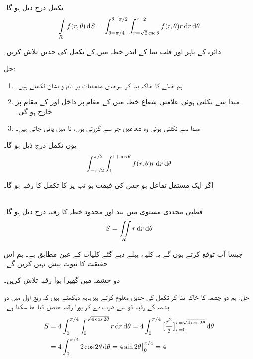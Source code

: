  تکمل درج ذیل ہو گا۔
\begin{align*}
\int\limits_R f(r,\theta)\dif S=\int_{\theta=\pi/4}^{\theta=\pi/2}\int_{r=\sqrt{2}\csc\theta}^{r=2}f(r,\theta)r\dif r\dif \theta
\end{align*}

دائرہ  کے باہر اور قلب نما  کے اندر خطہ میں   کے تکمل کی  حدیں  تلاش کریں۔ 

حل:\quad
\begin{enumerate}[1.]
\item
{}\quad
ہم خطے کا خاکہ بنا کر  سرحدی منحنیات پر نام و نشان لکھتے ہیں۔
\item
{}\quad
مبدا سے  نکلتی ہوئی  علامتی شعاع خطہ  میں  کے مقام پر داخل اور  کے مقام پر خارج ہو گی۔
\item
{}\quad
مبدا سے نکلتی ہوئی وہ شعاعیں جو  سے گزرتی ہوں،  تا  میں پائی جاتی ہیں۔
\end{enumerate}
یوں تکمل درج ذیل ہو گا۔
\begin{align*}
\int_{-\pi/2}^{\pi/2}\int_{1}^{1+\cos\theta}f(r,\theta)r\dif r\dif \theta
\end{align*}

اگر  ایک مستقل تفاعل ہو جس کی قیمت  ہو  تب  پر  کا تکمل  کا رقبہ ہو گا۔

\\
قطبی محددی مستوی میں بند اور محدود خطہ  کا  رقبہ درج ذیل ہو گا۔
\begin{align}
S=\iint\limits_R r\dif r\dif\theta
\end{align}

جیسا آپ توقع کرتے ہوں گے یہ کلیہ، پہلے دیے گئے کلیات کے عین مطابق ہے۔ ہم اس حقیقت کا ثبوت پیش نہیں کریں گے۔

دو  چشمہ  میں گھیرا ہوا  رقبہ تلاش کریں۔

حل:\quad
ہم دو چشمہ کا خاکہ بنا کر تکمل کی حدیں معلوم کرتے ہیں۔ہم دیکھتے ہیں کہ ربع اول میں دو چشمہ کے رقبہ کو  سے ضرب دے کر پورا رقبہ حاصل کیا جا سکتا ہے۔
\begin{align*}
S&=4\int_{0}^{\pi/4}\int_0^{\sqrt{4\cos2\theta}}r\dif r\dif \theta=4\int_0^{\pi/4}\big[\frac{r^2}{2}\big]_{r=0}^{r=\sqrt{4\cos2\theta}}\dif\theta\\
&=4\int_0^{\pi/4}2\cos2\theta\dif\theta=4\sin2\theta\big]_0^{\pi/4}=4
\end{align*}

